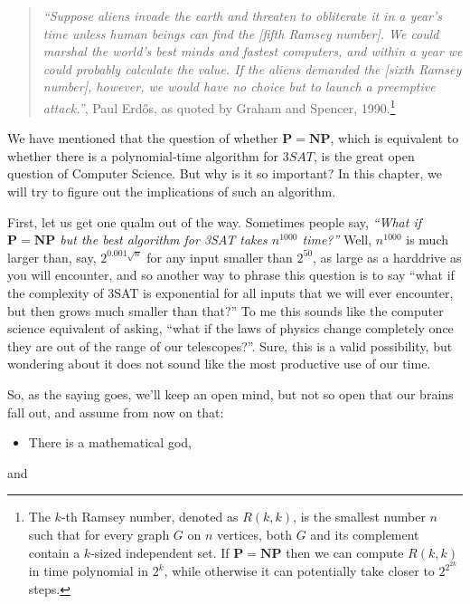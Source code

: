 \begin{quote}
\emph{``Suppose aliens invade the earth and threaten to obliterate it in
a year's time unless human beings can find the {[}fifth Ramsey
number{]}. We could marshal the world's best minds and fastest
computers, and within a year we could probably calculate the value. If
the aliens demanded the {[}sixth Ramsey number{]}, however, we would
have no choice but to launch a preemptive attack.''}, Paul Erdős, as
quoted by Graham and Spencer, 1990.\footnote{The \(k\)-th Ramsey number,
  denoted as \(R(k,k)\), is the smallest number \(n\) such that for
  every graph \(G\) on \(n\) vertices, both \(G\) and its complement
  contain a \(k\)-sized independent set. If \(\mathbf{P}=\mathbf{NP}\)
  then we can compute \(R(k,k)\) in time polynomial in \(2^k\), while
  otherwise it can potentially take closer to \(2^{2^{2k}}\) steps.}
\end{quote}

We have mentioned that the question of whether
\(\mathbf{P}=\mathbf{NP}\), which is equivalent to whether there is a
polynomial-time algorithm for \(3\ensuremath{\mathit{SAT}}\), is the
great open question of Computer Science. But why is it so important? In
this chapter, we will try to figure out the implications of such an
algorithm.

First, let us get one qualm out of the way. Sometimes people say,
\emph{``What if \(\mathbf{P}=\mathbf{NP}\) but the best algorithm for
3SAT takes \(n^{1000}\) time?''} Well, \(n^{1000}\) is much larger than,
say, \(2^{0.001\sqrt{n}}\) for any input smaller than \(2^{50}\), as
large as a harddrive as you will encounter, and so another way to phrase
this question is to say ``what if the complexity of 3SAT is exponential
for all inputs that we will ever encounter, but then grows much smaller
than that?'' To me this sounds like the computer science equivalent of
asking, ``what if the laws of physics change completely once they are
out of the range of our telescopes?''. Sure, this is a valid
possibility, but wondering about it does not sound like the most
productive use of our time.

So, as the saying goes, we'll keep an open mind, but not so open that
our brains fall out, and assume from now on that:

\begin{itemize}
\tightlist
\item
  There is a mathematical god,
\end{itemize}

and

